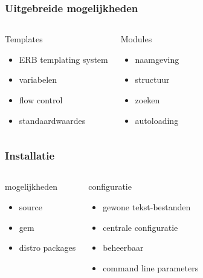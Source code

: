 \documentclass{beamer}
\begin{document}
\begin{frame}
\frametitle{Uitgebreide mogelijkheden}
\begin{columns}[c]
\begin{block}{Templates}
\begin{itemize}
	\item ERB templating system
	\item variabelen
	\item flow control
	\item standaardwaardes
\end{itemize}
\end{block}
\begin{block}{Modules}
\begin{itemize}
	\item naamgeving
	\item structuur
	\item zoeken
	\item autoloading
\end{itemize}
\end{block}
\end{columns}
\end{frame}

\begin{frame}
\frametitle{Installatie}
\begin{columns}[c]
\begin{block}{mogelijkheden}
\begin{itemize}
	\item source
	\item gem
	\item distro packages
\end{itemize}
\end{block}
\begin{block}{configuratie}
\begin{itemize}
	\item gewone tekst-bestanden
	\item centrale configuratie
	\item beheerbaar
	\item command line parameters
\end{itemize}
\end{block}
\end{columns}
\end{frame}
\end{document}
